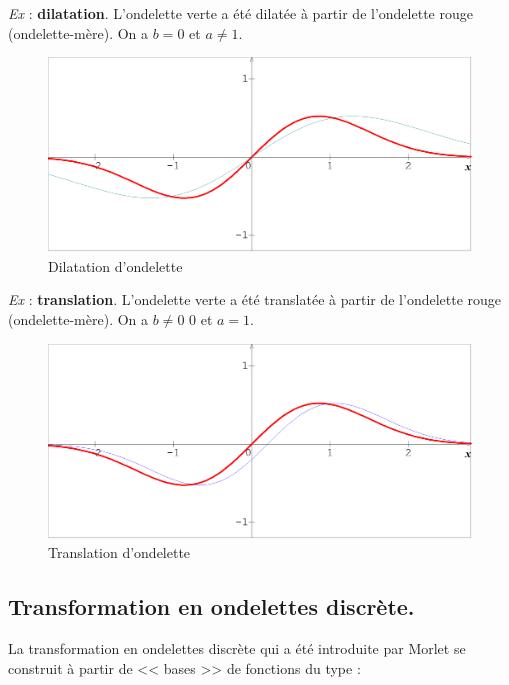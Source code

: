 \documentclass{article}
\begin{document}
\textit{Ex} : \textbf{dilatation}.
L’ondelette verte a été dilatée à partir de l’ondelette rouge (ondelette-mère). On a $b = 0$ et $a \neq 1$. \\

\begin{figure}[!h]
\centering
\includegraphics[scale=0.22]{dilatation.png}
\caption{Dilatation d'ondelette}
\label{dilat}
\end{figure}

\textit{Ex} : \textbf{translation}.
L’ondelette verte a été translatée à partir de l’ondelette rouge (ondelette-mère). On a $b \neq 0$ 0 et $a = 1$.

\begin{figure}[!h]
\centering
\includegraphics[scale=0.22]{translation.png}
\caption{Translation d'ondelette}
\label{translat}
\end{figure}

\subsection{Transformation en ondelettes discrète.}

La transformation en ondelettes discrète qui a été introduite par Morlet se construit à partir de << bases >> de fonctions du type : \\
\end{document}
